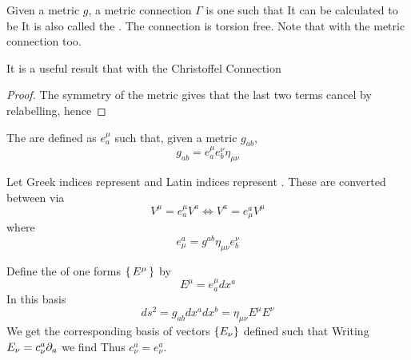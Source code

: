 \documentclass{article}
\begin{document}
\begin{definition}
Given a metric $g$, a metric connection $\Gamma$ is one such that 
It can be calculated to be 
It is also called the . The connection is torsion free. Note that with the metric connection
too. 
\end{definition}

\begin{lemma}
It is a useful result that 
with the Christoffel Connection
\end{lemma}
\begin{proof}
The symmetry of the metric gives that the last two terms cancel by relabelling, hence 
\end{proof}


\begin{definition}
The  are defined as $e^\mu_a$ such that, given a metric $g_{ab}$,
\[
g_{ab} = e^\mu_a e^\nu_b \eta_{\mu\nu}
\]
\end{definition}

\begin{definition}
Let Greek indices represent  and Latin indices represent . These are converted between via 
\[
V^\mu = e^\mu_a V^a \Leftrightarrow V^a = e^a_\mu V^\mu
\]
where 
\[
e^a_\mu=g^{ab} \eta_{\mu\nu} e^\nu_b
\]
\end{definition}

\begin{definition}
Define the  of one forms $\set{E^\mu}$ by 
\[
E^\mu = e^\mu_a dx^a
\]
In this basis 
\[
ds^2 = g_{ab} dx^a dx^b = \eta_{\mu\nu} E^{\mu} E^{\nu}
\]
We get the corresponding basis of vectors $\left\{  E_\nu \right\}$ defined such that 
Writing $E_\nu = c_\nu^a \partial_a$ we find 
Thus $c^a_\nu = e^a_\nu$. 
\end{definition} 
\end{document}
